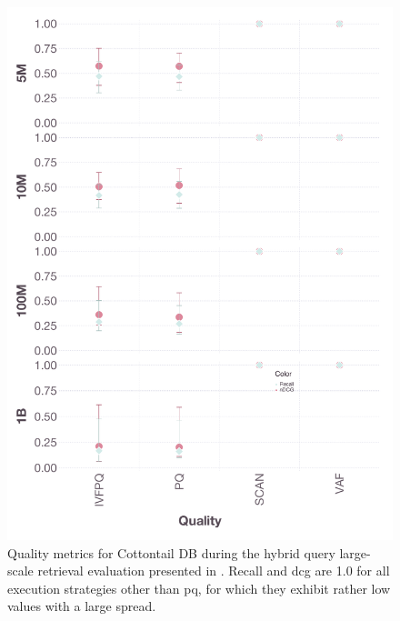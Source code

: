 \begin{figure}[bt]
    \includegraphics[width=\linewidth]{figures/bignns-cottontail-quality-Hybrid}
    \caption{Quality metrics for Cottontail DB during the hybrid query large-scale retrieval evaluation presented in . Recall and \acrshort{dcg} are 1.0 for all execution strategies other than \acrshort{pq}, for which they exhibit rather low values with a large spread.}
    \label{figure:appendix_bignns_cottontail_hybrid_quality}
\end{figure}
